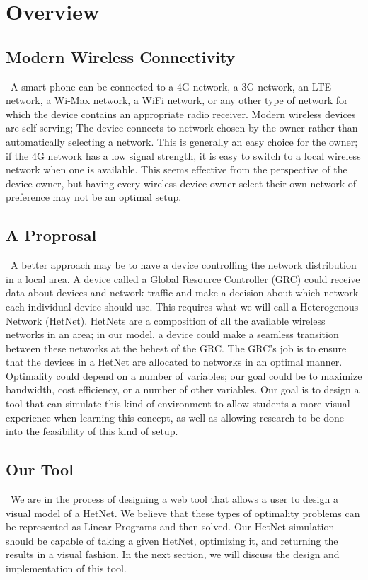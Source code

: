 \documentclass[11pt]{article}
\begin{document}
\section{Overview}
\subsection{Modern Wireless Connectivity}
~\indent A smart phone can be connected to a
4G network, a 3G network, an LTE network, a Wi-Max network, a WiFi network, 
or any other type of network for which the device contains an appropriate 
radio receiver. Modern wireless devices are self-serving; The device connects to network chosen by the owner
rather than automatically selecting a network. 
This is generally an easy choice for the owner; if the 4G network has a 
low signal strength, it is easy to switch to a local wireless network when one 
is available. This seems effective from the perspective of the device owner, 
but having every wireless device owner select their own network of preference 
may not be an optimal setup.

\subsection{A Proprosal}
~\indent A better approach may be to have a device controlling the network distribution
in a local area. A device called a Global Resource Controller (GRC) could receive
data about devices and network traffic and make a decision about which network
each individual device should use. This requires what we will call a Heterogenous 
Network (HetNet). HetNets are a composition of all the available wireless 
networks in an area; in our model, a device could make a seamless transition
between these networks at the behest of the GRC. The GRC's job is to ensure 
that the devices in a HetNet are allocated to networks in an optimal manner.
Optimality could depend on a number of variables; our goal could be to maximize
bandwidth, cost efficiency, or a number of other variables. Our goal is 
to design a tool that can simulate this kind of environment to allow students 
a more visual experience when learning this concept, as well as allowing research
to be done into the feasibility of this kind of setup.

\subsection{Our Tool}
~\indent We are in the process of designing a web tool that allows a user to design a 
visual model of a HetNet. We believe that these types of optimality problems
can be represented as Linear Programs and then solved. Our HetNet simulation
should be capable of taking a given HetNet, optimizing it, and returning the 
results in a visual fashion. In the next section, we will discuss the 
design and implementation of this tool.
\end{document}
